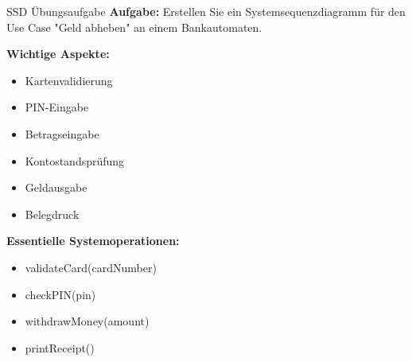 \begin{example2}{SSD Übungsaufgabe}
\textbf{Aufgabe:} Erstellen Sie ein Systemsequenzdiagramm für den Use Case "Geld abheben" an einem Bankautomaten.

\textbf{Wichtige Aspekte:}
\begin{itemize}
    \item Kartenvalidierung
    \item PIN-Eingabe
    \item Betragseingabe
    \item Kontostandsprüfung
    \item Geldausgabe
    \item Belegdruck
\end{itemize}

\textbf{Essentielle Systemoperationen:}
\begin{itemize}
    \item validateCard(cardNumber)
    \item checkPIN(pin)
    \item withdrawMoney(amount)
    \item printReceipt()
\end{itemize}
\end{example2}








